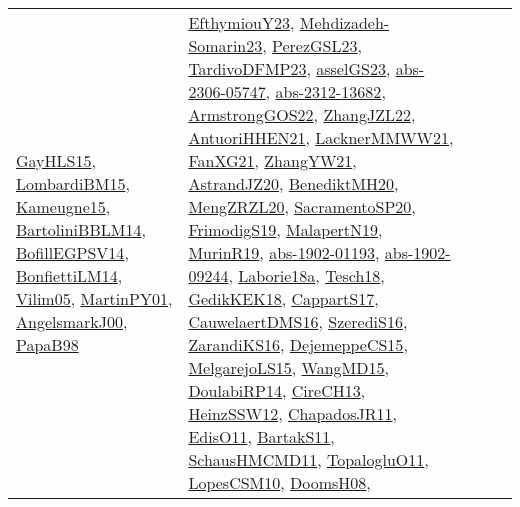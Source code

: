 {\begin{longtable}{llp{6cm}p{6cm}p{6cm}}
\href{papers/GayHLS15.pdf}{GayHLS15}\cite{GayHLS15}, \href{papers/LombardiBM15.pdf}{LombardiBM15}\cite{LombardiBM15}, \href{articles/Kameugne15.pdf}{Kameugne15}\cite{Kameugne15}, \href{papers/BartoliniBBLM14.pdf}{BartoliniBBLM14}\cite{BartoliniBBLM14}, \href{papers/BofillEGPSV14.pdf}{BofillEGPSV14}\cite{BofillEGPSV14}, \href{papers/BonfiettiLM14.pdf}{BonfiettiLM14}\cite{BonfiettiLM14}, \href{papers/Vilim05.pdf}{Vilim05}\cite{Vilim05}, \href{articles/MartinPY01.pdf}{MartinPY01}\cite{MartinPY01}, \href{papers/AngelsmarkJ00.pdf}{AngelsmarkJ00}\cite{AngelsmarkJ00}, \href{articles/PapaB98.pdf}{PapaB98}\cite{PapaB98} & \href{papers/EfthymiouY23.pdf}{EfthymiouY23}\cite{EfthymiouY23}, \href{papers/Mehdizadeh-Somarin23.pdf}{Mehdizadeh-Somarin23}\cite{Mehdizadeh-Somarin23}, \href{papers/PerezGSL23.pdf}{PerezGSL23}\cite{PerezGSL23}, \href{papers/TardivoDFMP23.pdf}{TardivoDFMP23}\cite{TardivoDFMP23}, \href{papers/asselGS23.pdf}{asselGS23}\cite{asselGS23}, \href{articles/abs-2306-05747.pdf}{abs-2306-05747}\cite{abs-2306-05747}, \href{articles/abs-2312-13682.pdf}{abs-2312-13682}\cite{abs-2312-13682}, \href{papers/ArmstrongGOS22.pdf}{ArmstrongGOS22}\cite{ArmstrongGOS22}, \href{papers/ZhangJZL22.pdf}{ZhangJZL22}\cite{ZhangJZL22}, \href{papers/AntuoriHHEN21.pdf}{AntuoriHHEN21}\cite{AntuoriHHEN21}, \href{papers/LacknerMMWW21.pdf}{LacknerMMWW21}\cite{LacknerMMWW21}, \href{articles/FanXG21.pdf}{FanXG21}\cite{FanXG21}, \href{articles/ZhangYW21.pdf}{ZhangYW21}\cite{ZhangYW21}, \href{articles/AstrandJZ20.pdf}{AstrandJZ20}\cite{AstrandJZ20}, \href{articles/BenediktMH20.pdf}{BenediktMH20}\cite{BenediktMH20}, \href{articles/MengZRZL20.pdf}{MengZRZL20}\cite{MengZRZL20}, \href{articles/SacramentoSP20.pdf}{SacramentoSP20}\cite{SacramentoSP20}, \href{papers/FrimodigS19.pdf}{FrimodigS19}\cite{FrimodigS19}, \href{papers/MalapertN19.pdf}{MalapertN19}\cite{MalapertN19}, \href{papers/MurinR19.pdf}{MurinR19}\cite{MurinR19}, \href{articles/abs-1902-01193.pdf}{abs-1902-01193}\cite{abs-1902-01193}, \href{articles/abs-1902-09244.pdf}{abs-1902-09244}\cite{abs-1902-09244}, \href{papers/Laborie18a.pdf}{Laborie18a}\cite{Laborie18a}, \href{papers/Tesch18.pdf}{Tesch18}\cite{Tesch18}, \href{articles/GedikKEK18.pdf}{GedikKEK18}\cite{GedikKEK18}, \href{papers/CappartS17.pdf}{CappartS17}\cite{CappartS17}, \href{papers/CauwelaertDMS16.pdf}{CauwelaertDMS16}\cite{CauwelaertDMS16}, \href{papers/SzerediS16.pdf}{SzerediS16}\cite{SzerediS16}, \href{articles/ZarandiKS16.pdf}{ZarandiKS16}\cite{ZarandiKS16}, \href{papers/DejemeppeCS15.pdf}{DejemeppeCS15}\cite{DejemeppeCS15}, \href{papers/MelgarejoLS15.pdf}{MelgarejoLS15}\cite{MelgarejoLS15}, \href{articles/WangMD15.pdf}{WangMD15}\cite{WangMD15}, \href{papers/DoulabiRP14.pdf}{DoulabiRP14}\cite{DoulabiRP14}, \href{papers/CireCH13.pdf}{CireCH13}\cite{CireCH13}, \href{articles/HeinzSSW12.pdf}{HeinzSSW12}\cite{HeinzSSW12}, \href{papers/ChapadosJR11.pdf}{ChapadosJR11}\cite{ChapadosJR11}, \href{papers/EdisO11.pdf}{EdisO11}\cite{EdisO11}, \href{articles/BartakS11.pdf}{BartakS11}\cite{BartakS11}, \href{articles/SchausHMCMD11.pdf}{SchausHMCMD11}\cite{SchausHMCMD11}, \href{articles/TopalogluO11.pdf}{TopalogluO11}\cite{TopalogluO11}, \href{articles/LopesCSM10.pdf}{LopesCSM10}\cite{LopesCSM10}, \href{papers/DoomsH08.pdf}{DoomsH08}\cite{DoomsH08}, 
\end{longtable}}
